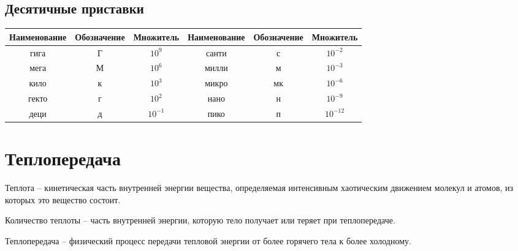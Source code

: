 \documentclass[12pt]{article}
\begin{document}
\subsection{Десятичные приставки}

\def\arraystretch{1.5}
\begin{center}
    \begin{tabular}{ccc|ccc}
        Наименование & Обозначение & Множитель & Наименование & Обозначение & Множитель\\
        \hline
        гига & Г & $10^9$ & санти & с & $10^{-2}$\\
        мега & М & $10^6$ & милли & м & $10^{-3}$\\
        кило & к & $10^3$ & микро & мк & $10^{-6}$\\
        гекто & г & $10^2$ & нано & н & $10^{-9}$\\
        деци & д & $10^{-1}$ & пико & п & $10^{-12}$
    \end{tabular}
\end{center}
\def\arraystretch{1}

\section{Теплопередача}

\begin{definition}
    Теплота – кинетическая часть внутренней энергии вещества, определяемая интенсивным хаотическим движением молекул и атомов, из которых это вещество состоит.
\end{definition}
\begin{definition}
    Количество теплоты – часть внутренней энергии, которую тело получает или теряет при теплопередаче.
\end{definition}
\begin{definition}
    Теплопередача – физический процесс передачи тепловой энергии от более горячего тела к более холодному.
\end{definition}

\begin{center}
\end{center}
\end{document}
